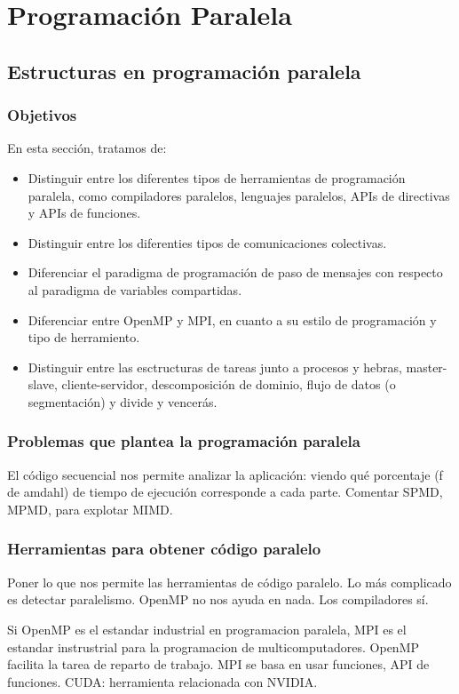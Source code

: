 \chapter{Programación Paralela}

\section{Estructuras en programación paralela}
\subsection{Objetivos}
En esta sección, tratamos de:
\begin{itemize}
    \item Distinguir entre los diferentes tipos de herramientas de programación paralela, como compiladores paralelos, lenguajes paralelos, APIs de directivas y APIs de funciones.
    \item Distinguir entre los diferenties tipos de comunicaciones colectivas.
    \item Diferenciar el paradigma de programación de paso de mensajes con respecto al paradigma de variables compartidas.
    \item Diferenciar entre OpenMP y MPI, en cuanto a su estilo de programación y tipo de herramiento.
    \item Distinguir entre las esctructuras de tareas junto a procesos y hebras, master-slave, cliente-servidor, descomposición de dominio, flujo de datos (o segmentación) y divide y vencerás.
\end{itemize}

\subsection{Problemas que plantea la programación paralela}
El código secuencial nos permite analizar la aplicación: viendo qué porcentaje (f de amdahl) de tiempo de ejecución corresponde a cada parte.
Comentar SPMD, MPMD, para explotar MIMD.


\subsection{Herramientas para obtener código paralelo}
Poner lo que nos permite las herramientas de código paralelo. Lo más complicado es detectar paralelismo. OpenMP no nos ayuda en nada. Los compiladores sí.

Si OpenMP es el estandar industrial en programacion paralela, MPI es el estandar instrustrial para la programacion de multicomputadores. OpenMP facilita la tarea de reparto de trabajo. MPI se basa en usar funciones, API de funciones.
CUDA: herramienta relacionada con NVIDIA.

